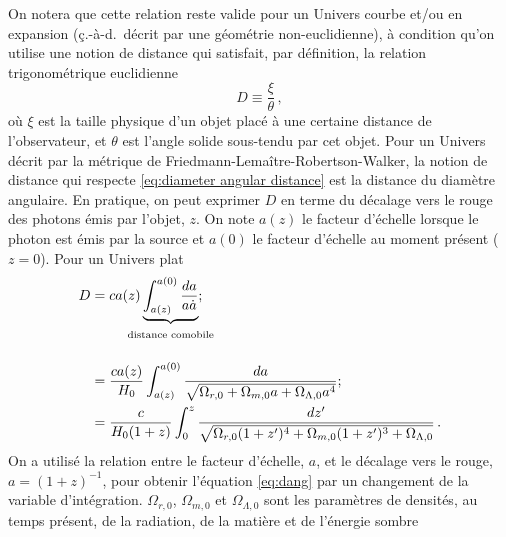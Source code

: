 On notera que cette relation reste valide pour un Univers courbe et/ou en expansion 
(ç.-à-d.\ décrit par une géométrie non-euclidienne), 
à condition qu'on utilise une notion de distance qui satisfait, par définition, la relation trigonométrique euclidienne
\begin{equation}\label{eq:diameter angular distance}
       D \equiv \frac{\xi}{\theta}\, ,
\end{equation} 
où $\xi$ est la taille physique d'un objet placé à une certaine distance de l'observateur, et $\theta$ est l'angle solide sous-tendu 
par cet objet. Pour un Univers décrit par la métrique de Friedmann-Lemaître-Robertson-Walker,
la notion de distance qui respecte \eqref{eq:diameter angular distance} est la distance du diamètre angulaire. 
En pratique, on peut exprimer $D$ en terme du décalage vers le rouge des photons émis par l'objet, $z$. 
On note $a(z)$ le facteur d'échelle lorsque le photon est émis par la source et $a(0)$ le facteur d'échelle au moment présent ($z=0$).
Pour un Univers plat \citep[voir les manuels de référence][]{Bartelmann2004,Coles2002,Dodelson2003}
\begin{align}
        D &= c a(z) \underbrace{\int_{a(z)}^{a(0)} \frac{da}{a \dot{a}}}_{\strut\mathclap{\text{distance comobile}}}; \\[2ex]
                \nonumber
              &= \frac{c a(z)}{H_0} \int_{a(z)}^{a(0)} \frac{da}{\sqrt{\Omega_{r,0} + \Omega_{m,0} a  + \Omega_{\Lambda,0}a^{4}}}; \\
              \label{eq:dang}
              &= \frac{c}{H_0(1 + z)} \int_{0}^{z} \frac{dz'}{\sqrt{\Omega_{r,0}(1 + z')^{4} + \Omega_{m,0} (1 + z')^{3} + \Omega_{\Lambda,0} }}\, .
\end{align}
On a utilisé la relation entre le facteur d'échelle, $a$, et le décalage vers le rouge, $a = (1 + z)^{-1}$, pour obtenir l'équation \eqref{eq:dang} 
par un changement de la variable d'intégration. 
$\Omega_{r,0}$, $\Omega_{m,0}$ et $\Omega_{\Lambda, 0}$ sont les paramètres de densités, au temps présent, de la radiation, de la matière et de l'énergie sombre 
